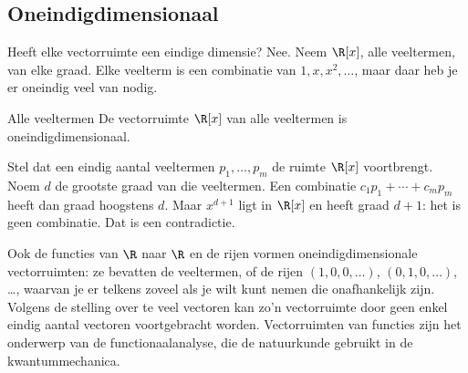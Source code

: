 
\begin{oefeningen}
\end{oefeningen}

\subsection{Oneindigdimensionaal}

Heeft elke vectorruimte een eindige dimensie? Nee. Neem $\R[x]$, alle veeltermen, van elke graad. Elke veelterm is een combinatie van $1, x, x^2, \ldots$, maar daar heb je er oneindig veel van nodig.

\begin{theorie}
\begin{stelling}{Alle veeltermen}
De vectorruimte $\R[x]$ van alle veeltermen is oneindigdimensionaal.
\end{stelling}

\begin{bewijs}
Stel dat een eindig aantal veeltermen $p_1, \ldots, p_m$ de ruimte $\R[x]$ voortbrengt. Noem $d$ de grootste graad van die veeltermen. Een combinatie $c_1p_1 + \cdots + c_mp_m$ heeft dan graad hoogstens $d$. Maar $x^{d+1}$ ligt in $\R[x]$ en heeft graad $d + 1$: het is geen combinatie. Dat is een contradictie.
\end{bewijs}
\end{theorie}

Ook de functies van $\R$ naar $\R$ en de rijen vormen oneindigdimensionale vectorruimten: ze bevatten de veeltermen, of de rijen $(1, 0, 0, \ldots)$, $(0, 1, 0, \ldots)$, \ldots, waarvan je er telkens zoveel als je wilt kunt nemen die onafhankelijk zijn. Volgens de stelling over te veel vectoren kan zo'n vectorruimte door geen enkel eindig aantal vectoren voortgebracht worden. Vectorruimten van functies zijn het onderwerp van de functionaalanalyse, die de natuurkunde gebruikt in de kwantummechanica.

